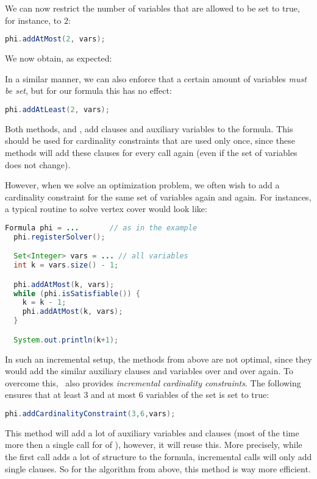 \documentclass[a4paper, ukenglish, twoside, openright]{jdrasilmanual}
\begin{document}

We can now restrict the number of variables that are allowed to be set
to true, for instance, to $2$:
\begin{lstlisting}[language=Java]
  phi.addAtMost(2, vars);
\end{lstlisting}
We now obtain, as expected:


In a similar manner, we can also enforce that a certain amount of
variables \emph{must be set}, but for our formula this has no effect:
\begin{lstlisting}[language=Java]
  phi.addAtLeast(2, vars);
\end{lstlisting}
Both methods, 
 and , add
clauses and auxiliary variables to the formula. This should be used
for cardinality constraints that are used only once, since these
methods will add these clauses for every call again (even if the set
of variables does not change).

However, when we solve an optimization problem, we often wish to add a
cardinality constraint for the same set of variables again and
again. For instances, a typical routine to solve vertex cover would
look like:
\begin{lstlisting}[language=Java]
  Formula phi = ...       // as in the example
  phi.registerSolver();

  Set<Integer> vars = ... // all variables
  int k = vars.size() - 1;

  phi.addAtMost(k, vars);
  while (phi.isSatisfiable()) {
    k = k - 1;
    phi.addAtMost(k, vars);
  }

  System.out.println(k+1);
\end{lstlisting}
In such an incremental setup, the methods from above are not optimal,
since they would add the similar auxiliary clauses and variables over
and over again. To overcome this, \Jdrasil\ also provides
\emph{incremental cardinality constraints}. The following ensures that
at least $3$ and at most $6$ variables of the set  is
set to true:
\begin{lstlisting}[language=Java]
  phi.addCardinalityConstraint(3,6,vars);
\end{lstlisting}
This 
method will add a lot of auxiliary variables and clauses (most of
the time more then a single call for of ), however,
it will reuse this. More precisely, while the first call adds a lot of
structure to the formula, incremental calls will only add single
clauses. So for the algorithm from above, this method is way more
efficient. 
\end{document}
